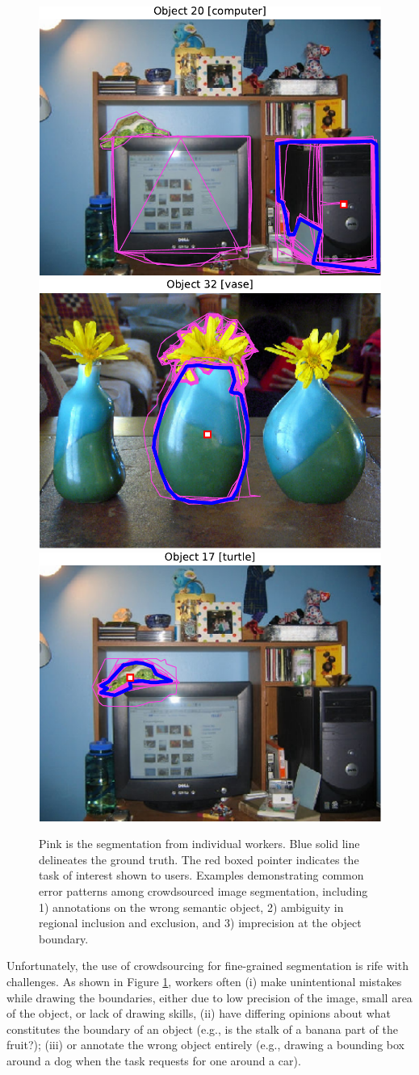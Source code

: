 \begin{figure}[ht!]
	\centering%
	\includegraphics[width=.31\textwidth]{plots/bb_object_20.pdf}
	\includegraphics[width=.31\textwidth]{plots/bb_object_32.pdf}
	\includegraphics[width=.31\textwidth]{plots/bb_object_17.pdf}
	\caption{Pink is the segmentation from individual workers. Blue solid line delineates the ground truth. The red boxed pointer indicates the task of interest shown to users. Examples demonstrating common error patterns among crowdsourced image segmentation, including 1) annotations on the wrong semantic object, 2) ambiguity in regional inclusion and exclusion, and 3) imprecision at the object boundary.}
	\label{error_examples}
\end{figure}
\par Unfortunately, the use of crowdsourcing for fine-grained segmentation is rife with challenges. As shown in Figure \ref{error_examples}, workers often (i) make unintentional mistakes while drawing the boundaries, either due to low precision of the image, small area of the object, or lack of drawing skills, (ii) have differing opinions about what constitutes the boundary of an object (e.g., is the stalk of a banana part of the fruit?); (iii) or annotate the wrong object entirely (e.g., drawing a bounding box around a dog when the task requests for one around a car). 
